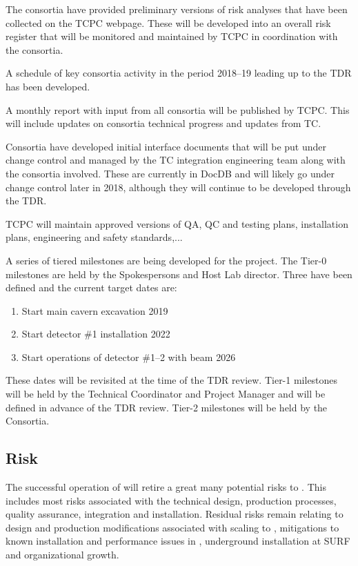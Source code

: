 The consortia have provided preliminary versions of risk analyses that
have been collected on the TCPC webpage. These will be developed into
an overall risk register that will be monitored and maintained by TCPC
in coordination with the consortia.

A schedule of key consortia activity in the period 2018--19 leading up
to the TDR has been developed.

A monthly report with input from all consortia will be published by
TCPC. This will include updates on consortia technical progress and
updates from TC.

Consortia have developed initial interface documents that will be put
under change control and managed by the TC integration engineering
team along with the consortia involved. These are currently in DocDB
and will likely go under change control later in 2018, although they
will continue to be developed through the TDR.

TCPC will maintain approved versions of QA, QC and testing plans,
installation plans, engineering and safety standards,...

A series of tiered milestones are being developed for the 
project. The Tier-0 milestones are held by the Spokespersons and Host
Lab director. Three have been defined and the current target dates
are:
\begin{enumerate}
\item Start main cavern excavation \hspace{2.1in} 2019
\item Start detector \#1 installation \hspace{2.1in} 2022
\item Start operations of detector \#1--2 with beam \hspace{1in} 2026
\end{enumerate}
These dates will be revisited at the time of the TDR review.  Tier-1
milestones will be held by the Technical Coordinator and  Project
Manager and will be defined in advance of the TDR review. Tier-2
milestones will be held by the Consortia.


\subsection{Risk}
\label{sec:fdsp-coord-risk}

The successful operation of  will retire a great many
potential risks to . This includes most risks associated with the
technical design, production processes, quality assurance, integration
and installation. Residual risks remain relating to design and
production modifications associated with scaling to , mitigations
to known installation and performance issues in , underground
installation at SURF and organizational growth.

